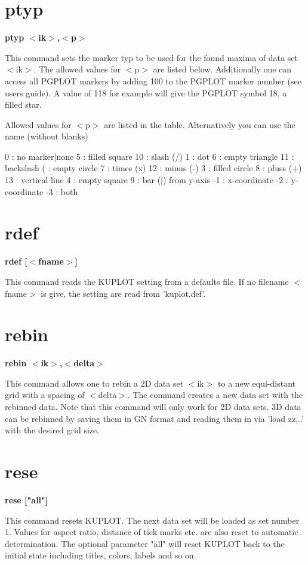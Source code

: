 \section{ptyp}
{\bf ptyp $ <$ik$> $,$ <$p$> $ \par }
\par
\vspace{3pt}
This command sets the marker typ to be used for the found maxima of 
data set $ <$ik$> $. The allowed values for $ <$p$> $ are listed below. 
Additionally one can access all PGPLOT markers by adding 100 to the 
PGPLOT marker number (see users guide). A value of 118 for example 
will give the PGPLOT symbol 18, a filled star. 
\par
Allowed values for $ <$p$> $ are listed in the table. Alternatively 
you can use the name (without blanks) 
\par
\begin{MacVerbatim}
  0 : no marker|none  5 : filled square    10 : slash (/)
  1 : dot             6 : empty triangle   11 : backslash ( : empty circle    7 : times (x)        12 : minus (-)
  3 : filled circle   8 : pluss (+)        13 : vertical line
  4 : empty square    9 : bar  (|)              from y-axis
 -1 : x-coordinate   -2 : y-coordinate     -3 : both
\end{MacVerbatim}
\section{rdef}
{\bf rdef [$ <$fname$> $] \par }
\par
\vspace{3pt}
This command reads the KUPLOT setting from a defaults file. If 
no filename $ <$fname$> $ is give, the setting are read from 'kuplot.def'. 
\section{rebin}
{\bf rebin $ <$ik$> $,$ <$delta$> $ \par }
\par
\vspace{3pt}
This command allows one to rebin a 2D data set $ <$ik$> $ to a new 
equi-distant grid with a spacing of $ <$delta$> $. The command creates 
a new data set with the rebinned data. Note that this command will 
only work for 2D data sets. 3D data can be rebinned by saving them 
in GN format and reading them in via 'load zz,..' with the desired 
grid size. 
\section{rese}
{\bf rese ["all"] \par }
\par
\vspace{3pt}
This command resets KUPLOT. The next data set will be loaded as set 
number 1. Values for aspect ratio, distance of tick marks etc. are 
also reset to automatic determination. The optional parameter "all" 
will reset KUPLOT back to the initial state including titles, colors, 
labels and so on. 
